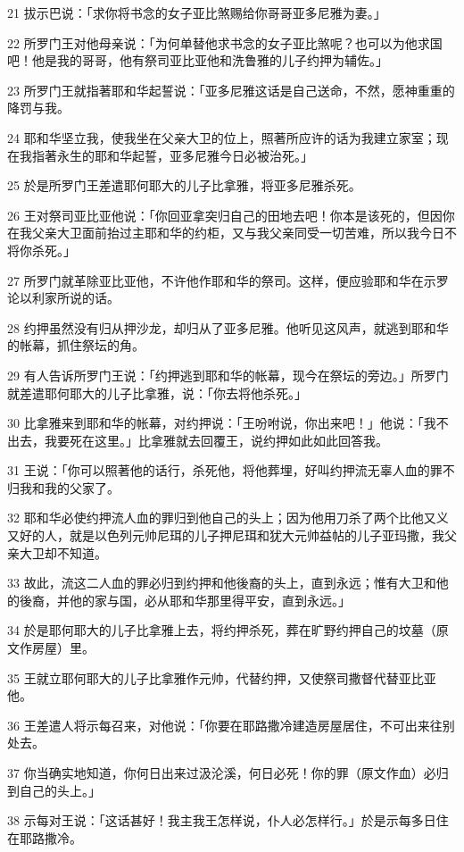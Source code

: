 \par 21 拔示巴说：「求你将书念的女子亚比煞赐给你哥哥亚多尼雅为妻。」
\par 22 所罗门王对他母亲说：「为何单替他求书念的女子亚比煞呢？也可以为他求国吧！他是我的哥哥，他有祭司亚比亚他和洗鲁雅的儿子约押为辅佐。」
\par 23 所罗门王就指著耶和华起誓说：「亚多尼雅这话是自己送命，不然，愿神重重的降罚与我。
\par 24 耶和华坚立我，使我坐在父亲大卫的位上，照著所应许的话为我建立家室；现在我指著永生的耶和华起誓，亚多尼雅今日必被治死。」
\par 25 於是所罗门王差遣耶何耶大的儿子比拿雅，将亚多尼雅杀死。
\par 26 王对祭司亚比亚他说：「你回亚拿突归自己的田地去吧！你本是该死的，但因你在我父亲大卫面前抬过主耶和华的约柜，又与我父亲同受一切苦难，所以我今日不将你杀死。」
\par 27 所罗门就革除亚比亚他，不许他作耶和华的祭司。这样，便应验耶和华在示罗论以利家所说的话。
\par 28 约押虽然没有归从押沙龙，却归从了亚多尼雅。他听见这风声，就逃到耶和华的帐幕，抓住祭坛的角。
\par 29 有人告诉所罗门王说：「约押逃到耶和华的帐幕，现今在祭坛的旁边。」所罗门就差遣耶何耶大的儿子比拿雅，说：「你去将他杀死。」
\par 30 比拿雅来到耶和华的帐幕，对约押说：「王吩咐说，你出来吧！」他说：「我不出去，我要死在这里。」比拿雅就去回覆王，说约押如此如此回答我。
\par 31 王说：「你可以照著他的话行，杀死他，将他葬埋，好叫约押流无辜人血的罪不归我和我的父家了。
\par 32 耶和华必使约押流人血的罪归到他自己的头上；因为他用刀杀了两个比他又义又好的人，就是以色列元帅尼珥的儿子押尼珥和犹大元帅益帖的儿子亚玛撒，我父亲大卫却不知道。
\par 33 故此，流这二人血的罪必归到约押和他後裔的头上，直到永远；惟有大卫和他的後裔，并他的家与国，必从耶和华那里得平安，直到永远。」
\par 34 於是耶何耶大的儿子比拿雅上去，将约押杀死，葬在旷野约押自己的坟墓（原文作房屋）里。
\par 35 王就立耶何耶大的儿子比拿雅作元帅，代替约押，又使祭司撒督代替亚比亚他。
\par 36 王差遣人将示每召来，对他说：「你要在耶路撒冷建造房屋居住，不可出来往别处去。
\par 37 你当确实地知道，你何日出来过汲沦溪，何日必死！你的罪（原文作血）必归到自己的头上。」
\par 38 示每对王说：「这话甚好！我主我王怎样说，仆人必怎样行。」於是示每多日住在耶路撒冷。

